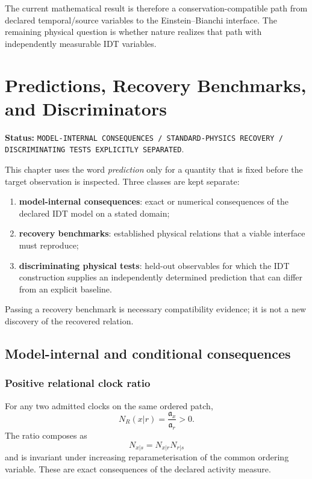 \documentclass[11pt]{book}
\begin{document}
The current mathematical result is therefore a conservation-compatible path from declared temporal/source variables to the Einstein--Bianchi interface. The remaining physical question is whether nature realizes that path with independently measurable IDT variables.

\chapter{Predictions, Recovery Benchmarks, and Discriminators}

\noindent\textbf{Status:} \texttt{MODEL-INTERNAL CONSEQUENCES / STANDARD-PHYSICS RECOVERY / DISCRIMINATING TESTS EXPLICITLY SEPARATED}.

This chapter uses the word \emph{prediction} only for a quantity that is fixed before the target observation is inspected. Three classes are kept separate:
\begin{enumerate}
\item \textbf{model-internal consequences}: exact or numerical consequences of the declared IDT model on a stated domain;
\item \textbf{recovery benchmarks}: established physical relations that a viable interface must reproduce;
\item \textbf{discriminating physical tests}: held-out observables for which the IDT construction supplies an independently determined prediction that can differ from an explicit baseline.
\end{enumerate}
Passing a recovery benchmark is necessary compatibility evidence; it is not a new discovery of the recovered relation.

\section{Model-internal and conditional consequences}

\subsection{Positive relational clock ratio}

For any two admitted clocks on the same ordered patch,
\[
\boxed{
N_R(x|r)=\frac{\mathfrak a_x}{\mathfrak a_r}>0.
}
\]
The ratio composes as
\[
N_{x|s}=N_{x|r}N_{r|s}
\]
and is invariant under increasing reparameterisation of the common ordering variable. These are exact consequences of the declared activity measure.
\end{document}

